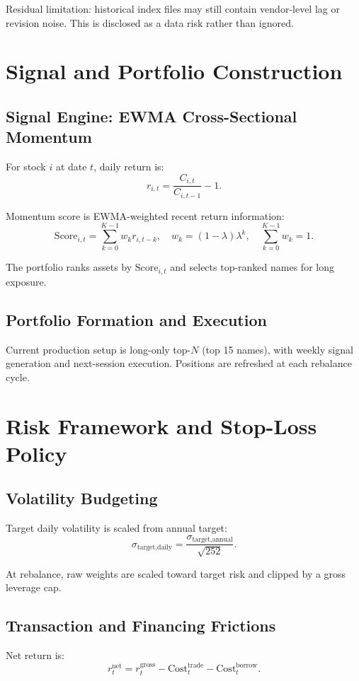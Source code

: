 \documentclass[11pt]{article}
\begin{document}
Residual limitation: historical index files may still contain vendor-level lag or revision noise. This is disclosed as a data risk rather than ignored.

\section{Signal and Portfolio Construction}
\subsection{Signal Engine: EWMA Cross-Sectional Momentum}
For stock $i$ at date $t$, daily return is:
\begin{equation}
r_{i,t}=\frac{C_{i,t}}{C_{i,t-1}}-1.
\end{equation}

Momentum score is EWMA-weighted recent return information:
\begin{equation}
\text{Score}_{i,t}=\sum_{k=0}^{K-1} w_k r_{i,t-k}, \quad
w_k=(1-\lambda)\lambda^k, \quad \sum_{k=0}^{K-1} w_k=1.
\end{equation}

The portfolio ranks assets by $\text{Score}_{i,t}$ and selects top-ranked names for long exposure.

\subsection{Portfolio Formation and Execution}
Current production setup is long-only top-$N$ (top 15 names), with weekly signal generation and next-session execution. Positions are refreshed at each rebalance cycle.

\section{Risk Framework and Stop-Loss Policy}
\subsection{Volatility Budgeting}
Target daily volatility is scaled from annual target:
\begin{equation}
\sigma_{\text{target,daily}}=\frac{\sigma_{\text{target,annual}}}{\sqrt{252}}.
\end{equation}

At rebalance, raw weights are scaled toward target risk and clipped by a gross leverage cap.

\subsection{Transaction and Financing Frictions}
Net return is:
\begin{equation}
r_t^{\text{net}}=r_t^{\text{gross}}-\text{Cost}_t^{\text{trade}}-\text{Cost}_t^{\text{borrow}}.
\end{equation}
\end{document}
